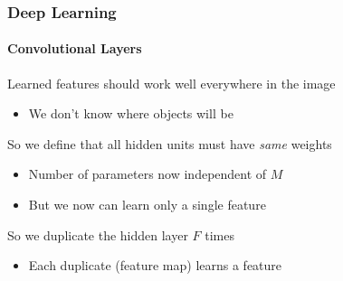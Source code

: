 \documentclass[xetex,professionalfont]{beamer}
\renewcommand\emph[1]{\textcolor{tuwcvl_inf_red}{#1}}
\begin{document}

\begin{frame}
\frametitle{Deep Learning}
\framesubtitle{Convolutional Layers}

Learned features should work well everywhere in the image
\begin{itemize}
    \item We don't know where objects will be
\end{itemize}

\bigskip
So we define that all hidden units must have \textit{same} weights
\begin{itemize}
    \item Number of parameters now independent of $M$ %
    \item But we now can learn only a single feature
\end{itemize}

\bigskip
So we duplicate the hidden layer $F$ times
\begin{itemize}
    \item Each duplicate (\emph{feature map}) learns a feature
\end{itemize}

\end{frame}

\end{document}
